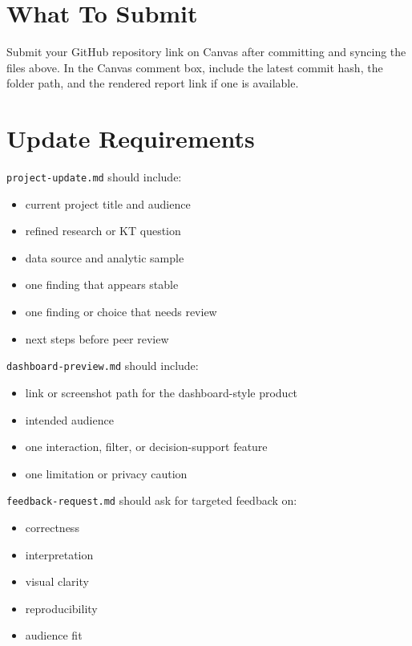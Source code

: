 \documentclass[
  letterpaper,
  DIV=11,
  numbers=noendperiod,
  oneside]{scrreprt}
\providecommand{\tightlist}{%
  \setlength{\itemsep}{0pt}\setlength{\parskip}{0pt}}
\begin{document}
\section{What To Submit}\label{what-to-submit-3}

Submit your GitHub repository link on Canvas after committing and
syncing the files above. In the Canvas comment box, include the latest
commit hash, the folder path, and the rendered report link if one is
available.

\section{Update Requirements}\label{update-requirements}

\texttt{project-update.md} should include:

\begin{itemize}
\tightlist
\item
  current project title and audience
\item
  refined research or KT question
\item
  data source and analytic sample
\item
  one finding that appears stable
\item
  one finding or choice that needs review
\item
  next steps before peer review
\end{itemize}

\texttt{dashboard-preview.md} should include:

\begin{itemize}
\tightlist
\item
  link or screenshot path for the dashboard-style product
\item
  intended audience
\item
  one interaction, filter, or decision-support feature
\item
  one limitation or privacy caution
\end{itemize}

\texttt{feedback-request.md} should ask for targeted feedback on:

\begin{itemize}
\tightlist
\item
  correctness
\item
  interpretation
\item
  visual clarity
\item
  reproducibility
\item
  audience fit
\end{itemize}
\end{document}
